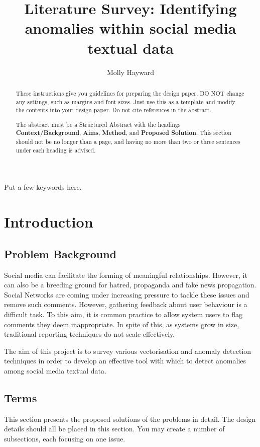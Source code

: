 \documentclass[12pt,a4paper]{article}
\title{Literature Survey: Identifying anomalies within social media textual data}
\author{Molly Hayward}
\date{}
\begin{document}
\maketitle

\begin{abstract}
These instructions give you guidelines for preparing the design paper.  DO NOT change any settings, such as margins and font sizes.  Just use this as a template and modify the contents into your design paper.  Do not cite references in the abstract.

The abstract must be a Structured Abstract with the headings {\bf Context/Background}, {\bf Aims}, {\bf Method}, and {\bf Proposed Solution}.  This section should not be no longer than a page, and having no more than two or three sentences under each heading is advised.
\end{abstract}

\begin{keywords}
Put a few keywords here.
\end{keywords}

\section{Introduction}

\subsection{Problem Background}
Social media can facilitate the forming of meaningful relationships. However, it can also be a breeding ground for hatred, propaganda and fake news propagation. Social Networks are coming under increasing pressure to tackle these issues and remove such comments. However, gathering feedback about user behaviour is a difficult task. To this aim, it is common practice to allow system users to flag comments they deem inappropriate. In spite of this, as systems grow in size, traditional reporting techniques do not scale effectively. 

The aim of this project is to survey various vectorisation and anomaly detection techniques in order to develop an effective tool with which to detect anomalies among social media textual data.


\subsection{Terms}

This section presents the proposed solutions of the problems in detail. The design details should all be placed in this section. You may create a number of subsections, each focusing on one issue.
\end{document}
